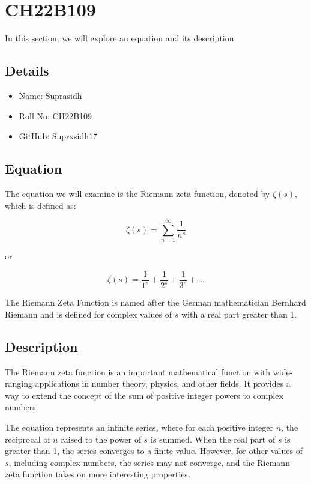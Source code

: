 \documentclass{article}
\begin{document}
\section{CH22B109}

In this section, we will explore an equation and its description.

\subsection{Details}

\begin{itemize}
  \item Name: Suprasidh
  \item Roll No: CH22B109
  \item GitHub: Suprxsidh17
\end{itemize}

\subsection{Equation}

The equation we will examine is the Riemann zeta function, denoted by \(\zeta(s)\), which is defined as:

\begin{equation}
    \zeta(s) = \sum_{n=1}^{\infty} \frac{1}{n^s}
\end{equation}

or

\begin{equation}
    \zeta(s) =\frac{1}{1^s}+\frac{1}{2^s}+\frac{1}{3^s}+...
\end{equation}
 
The Riemann Zeta Function is named after the German mathematician Bernhard Riemann and is defined for complex values of \(s\) with a 
real part greater than 1.

\subsection{Description}

The Riemann zeta function is an important mathematical function with wide-ranging applications in number theory, physics, and other 
fields. It provides a way to extend the concept of the sum of positive integer powers to complex numbers.

The equation represents an infinite series, where for each positive integer \(n\), the reciprocal of \(n\) raised to the power of 
\(s\) is summed. When the real part of \(s\) is greater than 1, the series converges to a finite value. However, for other values of 
\(s\), including complex numbers, the series may not converge, and the Riemann zeta function takes on more interesting properties.
\end{document}
